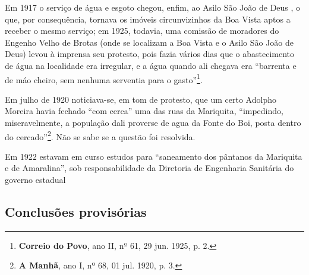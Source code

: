 Em 1917 o serviço de água e esgoto chegou, enfim, ao Asilo São João de Deus \cite[p.~63]{bahia_rpe_1914}, o que, por consequência, tornava os imóveis circunvizinhos da Boa Vista aptos a receber o mesmo serviço; em 1925, todavia, uma comissão de moradores do Engenho Velho de Brotas (onde se localizam a Boa Vista e o Asilo São João de Deus) levou à imprensa seu protesto, pois fazia vários dias que o abastecimento de água na localidade era irregular, e a água quando ali chegava era ``barrenta e de máo cheiro, sem nenhuma serventia para o gasto''\footnote{\textbf{Correio do Povo}, ano II, nº 61, 29 jun. 1925, p. 2.}.

Em julho de 1920 noticiava-se, em tom de protesto, que um certo Adolpho Moreira havia fechado ``com cerca'' uma das ruas da Mariquita, ``impedindo, miseravelmente, a população dali proverse de agua da Fonte do Boi, posta dentro do cercado''\footnote{\textbf{A Manhã}, ano I, nº 68, 01 jul. 1920, p. 3.}. Não se sabe se a questão foi resolvida.

Em 1922 estavam em curso estudos para ``saneamento dos pântanos da Mariquita e de Amaralina'', sob responsabilidade da Diretoria de Engenharia Sanitária do governo estadual \cite[p.~409]{bahia_rpe_1922}

\subsection{Conclusões provisórias}
